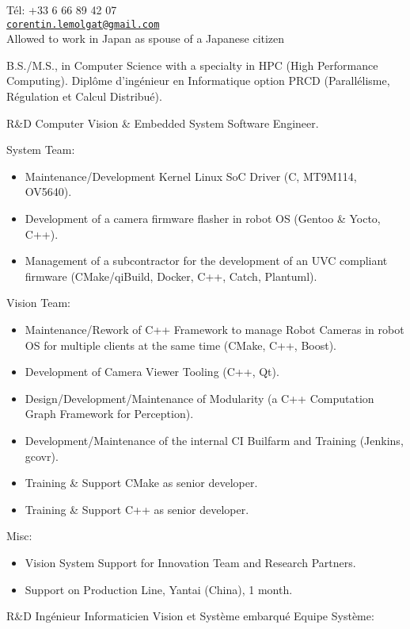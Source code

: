 \documentclass{article}
\begin{document}


T\'{e}l: +33 6 66 89 42 07\\
\href{mailto:corentin.lemolgat@gmail.com}{\texttt{corentin.lemolgat@gmail.com}}\\
Allowed to work in Japan as spouse of a Japanese citizen\\

\begin{llist}
 
 {
B.S./M.S., in Computer Science with a specialty in HPC (High Performance Computing).
} {
Dipl\^{o}me d'ing\'{e}nieur en Informatique option PRCD (Parall\'{e}lisme,
R\'{e}gulation et Calcul Distribu\'{e}).
}

{}
{}
\vspace{-0.33cm}

 {
R\&D Computer Vision \& Embedded System Software Engineer.\\
\vspace{-0.33cm}

System Team:
\begin{itemize}
\item Maintenance/Development Kernel Linux SoC Driver (C, MT9M114, OV5640).
\item Development of a camera firmware flasher in robot OS (Gentoo \& Yocto, C++).
\item Management of a subcontractor for the development of an UVC compliant firmware (CMake/qiBuild, Docker, C++, Catch, Plantuml).
\end{itemize}
Vision Team:
\begin{itemize}
\item Maintenance/Rework of C++ Framework to manage Robot Cameras in robot OS for multiple clients at the same time (CMake, C++, Boost).
\item Development of Camera Viewer Tooling (C++, Qt).
\item Design/Development/Maintenance of Modularity (a C++ Computation Graph Framework for Perception).
\item Development/Maintenance of the internal CI Builfarm and Training (Jenkins,
 gcovr).
\item Training \& Support CMake as senior developer.
\item Training \& Support C++ as senior developer.
\end{itemize}
Misc:
\begin{itemize}
\item Vision System Support for Innovation Team and Research Partners.
\item Support on Production Line, Yantai (China), 1 month.
\end{itemize}
}{
R\&D Ing\'{e}nieur Informaticien Vision et Syst\`{e}me embarqu\'{e}
\vspace{-0.33cm}
Equipe Syst\`{e}me:

}
\end{llist}
\end{document}
